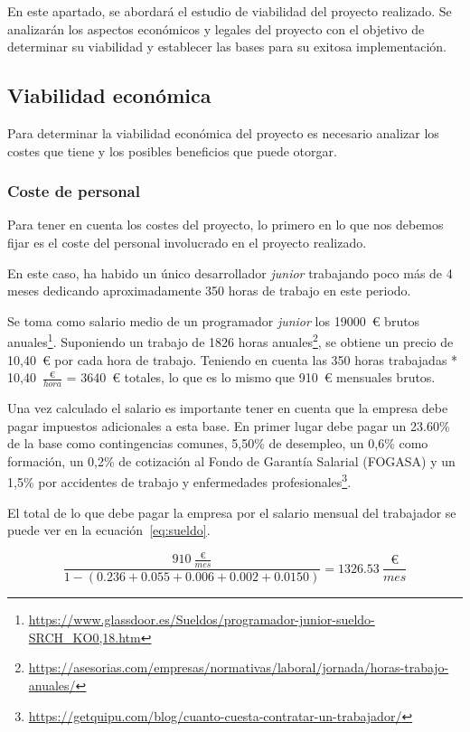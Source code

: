 En este apartado, se abordará el estudio de viabilidad del proyecto realizado.
Se analizarán los aspectos económicos y legales del proyecto con el objetivo de determinar su viabilidad y establecer las bases para su exitosa implementación.

\subsection{Viabilidad económica}
Para determinar la viabilidad económica del proyecto es necesario analizar los costes que tiene y los posibles beneficios que puede otorgar.

\subsubsection{Coste de personal}
Para tener en cuenta los costes del proyecto, lo primero en lo que nos debemos fijar es el coste del personal involucrado en el proyecto realizado.

En este caso, ha habido un único desarrollador \textit{junior} trabajando poco más de 4 meses dedicando aproximadamente 350 horas de trabajo en este periodo.

Se toma como salario medio de un programador \textit{junior} los 19000~€ brutos anuales\footnote{\url{https://www.glassdoor.es/Sueldos/programador-junior-sueldo-SRCH_KO0,18.htm}}.
Suponiendo un trabajo de 1826 horas anuales\footnote{\url{https://asesorias.com/empresas/normativas/laboral/jornada/horas-trabajo-anuales/}}, se obtiene un precio de 10,40~€ por cada hora de trabajo.
Teniendo en cuenta las 350 horas trabajadas * 10,40~$\frac{\text{€}}{hora}$ = 3640~€ totales, lo que es lo mismo que 910~€ mensuales brutos.

Una vez calculado el salario es importante tener en cuenta que la empresa debe pagar impuestos adicionales a esta base.
En primer lugar debe pagar un 23.60\% de la base como contingencias comunes, 5,50\% de desempleo, un 0,6\% como formación, un 0,2\% de cotización al Fondo de Garantía Salarial (FOGASA) y un 1,5\% por accidentes de trabajo y enfermedades profesionales\footnote{\url{https://getquipu.com/blog/cuanto-cuesta-contratar-un-trabajador/}}.

El total de lo que debe pagar la empresa por el salario mensual del trabajador se puede ver en la ecuación~\ref{eq:sueldo}.

\begin{equation}\label{eq:sueldo}
\frac{910~\frac{\text{€}}{mes}}{1 - (0.236 + 0.055 + 0.006 + 0.002 + 0.0150)} = 1326.53~ \frac{\text{€}}{mes}
\end{equation}

